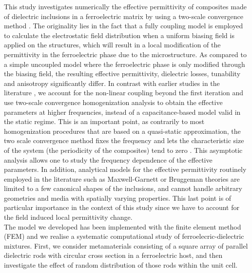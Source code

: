 \documentclass[%
 aip,
 amsmath,amssymb,
 reprint,%
]{revtex4-1}
\newcommand{\co}[1]{#1}
\begin{document}
This study investigates \co{numerically} the effective permittivity of composites made of
 dielectric inclusions in a ferroelectric matrix
by using a two-scale convergence method \cite{allaire_homogenization_1992,
 guenneau_homogenization_2000}.
The originality lies in the fact that a fully coupling model is employed to
calculate the electrostatic field distribution when a uniform biasing field is
applied on the structures, which will result in a local modification of the permittivity
in the ferroelectric phase due to the microstructure. As compared to a simple uncoupled model where the
ferroelectric phase is only modified through the biasing field,
the resulting effective permittivity, dielectric losses, tunability and
anisotropy significantly differ. \co{In contrast with} earlier studies in the
\co{literature} \cite{padurariu_tailoring_2012,padurariu_field-dependent_2012}, we account for
the non-linear coupling beyond the first iteration and use two-scale
convergence homogenization analysis to obtain the effective parameters at
higher frequencies, instead of a capacitance-based model \co{valid in the static regime.
This is an important point, as contrarily to most homogenization procedures that are based on a
quasi-static approximation, the two scale convergence method fixes the frequency and lets the characteristic
size of the system (the periodicity of the composites) tend to zero \cite{guenneau_homogenization_2000}. This asymptotic analysis allows one to study the frequency dependence of the effective parameters.
In addition, analytical models for the effective permittivity routinely employed in the literature
such as Maxwell-Garnett or Bruggeman theories are limited to a few canonical shapes of the inclusions, and
cannot handle arbitrary geometries and media with spatially varying properties. This last point is
of particular importance in the context of this study since we have to account for the field induced local permittivity change.}\\
\co{The model we developed has been implemented with the finite element method (FEM)
and we realise a systematic computational study of ferroelecric-dielectric mixtures.
First, we consider} metamaterials consisting of a square array of parallel
dielectric rods with circular cross section in a ferroelectric host, and
then investigate the effect of random distribution of those rods within the unit cell.


\end{document}

